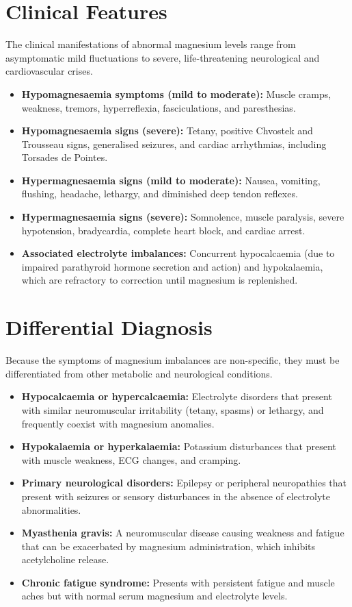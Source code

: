 \section*{Clinical Features}
The clinical manifestations of abnormal magnesium levels range from asymptomatic mild fluctuations to severe, life-threatening neurological and cardiovascular crises.
\begin{itemize}
    \item \textbf{Hypomagnesaemia symptoms (mild to moderate):} Muscle cramps, weakness, tremors, hyperreflexia, fasciculations, and paresthesias.
    \item \textbf{Hypomagnesaemia signs (severe):} Tetany, positive Chvostek and Trousseau signs, generalised seizures, and cardiac arrhythmias, including Torsades de Pointes.
    \item \textbf{Hypermagnesaemia signs (mild to moderate):} Nausea, vomiting, flushing, headache, lethargy, and diminished deep tendon reflexes.
    \item \textbf{Hypermagnesaemia signs (severe):} Somnolence, muscle paralysis, severe hypotension, bradycardia, complete heart block, and cardiac arrest.
    \item \textbf{Associated electrolyte imbalances:} Concurrent hypocalcaemia (due to impaired parathyroid hormone secretion and action) and hypokalaemia, which are refractory to correction until magnesium is replenished.
\end{itemize}

\section*{Differential Diagnosis}
Because the symptoms of magnesium imbalances are non-specific, they must be differentiated from other metabolic and neurological conditions.
\begin{itemize}
    \item \textbf{Hypocalcaemia or hypercalcaemia:} Electrolyte disorders that present with similar neuromuscular irritability (tetany, spasms) or lethargy, and frequently coexist with magnesium anomalies.
    \item \textbf{Hypokalaemia or hyperkalaemia:} Potassium disturbances that present with muscle weakness, ECG changes, and cramping.
    \item \textbf{Primary neurological disorders:} Epilepsy or peripheral neuropathies that present with seizures or sensory disturbances in the absence of electrolyte abnormalities.
    \item \textbf{Myasthenia gravis:} A neuromuscular disease causing weakness and fatigue that can be exacerbated by magnesium administration, which inhibits acetylcholine release.
    \item \textbf{Chronic fatigue syndrome:} Presents with persistent fatigue and muscle aches but with normal serum magnesium and electrolyte levels.
\end{itemize}


